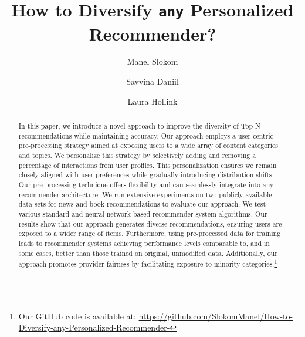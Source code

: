 \documentclass[runningheads]{llncs}
\begin{document}
\newcommand\mycommfont[1]{\footnotesize\ttfamily\textcolor{black}{#1}}

%
\title{How to Diversify \texttt{any} Personalized Recommender?}
%
%
\author{Manel Slokom \and 
Savvina Daniil \and
Laura Hollink}



%
\maketitle              %
%

\begin{abstract}

In this paper, we introduce a novel approach to improve the diversity of Top-N recommendations while maintaining accuracy. 
Our approach employs a user-centric pre-processing strategy aimed at exposing users to a wide array of content categories and topics.
We personalize this strategy by selectively adding and removing a percentage of interactions from user profiles. 
This personalization ensures we remain closely aligned with user preferences while gradually introducing distribution shifts. 
Our pre-processing technique offers flexibility and can seamlessly integrate into any recommender architecture.
We run extensive experiments on two publicly available data sets for news and book recommendations to evaluate our approach.
We test various standard and neural network-based recommender system algorithms.
Our results show that our approach generates diverse recommendations, ensuring users are exposed to a wider range of items. 
Furthermore, using pre-processed data for training leads to recommender systems achieving performance levels comparable to, and in some cases, better than those trained on original, unmodified data.
Additionally, our approach promotes provider fairness by facilitating exposure to minority categories.\footnote{Our GitHub code is available at: \url{https://github.com/SlokomManel/How-to-Diversify-any-Personalized-Recommender-}}


\end{abstract}
%
%
%
\end{document}
